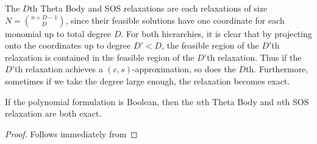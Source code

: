 The $D$th Theta Body and SOS relaxations are each relaxations of size $N = \binom{n+D-1}{D}$, since their feasible solutions have one coordinate for each monomial up to total degree $D$. For both hierarchies, it is clear that by projecting onto the coordinates up to degree $D' < D$, the feasible region of the $D'$th relaxation is contained in the feasible region of the $D'$th relaxation. Thus if the $D'$th relaxation achieves a $(c,s)$-approximation, so does the $D$th. Furthermore, sometimes if we take the degree large enough, the relaxation becomes exact.
\begin{lemma}
If the polynomial formulation is Boolean, then the $n$th Theta Body and $n$th SOS relaxation are both exact.
\end{lemma}
\begin{proof}
Follows immediately from 
\end{proof}

